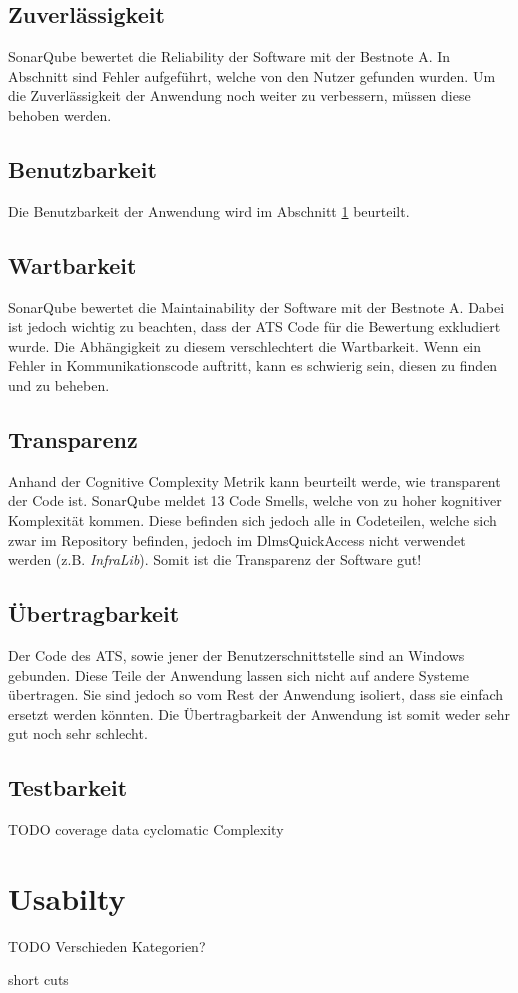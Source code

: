 \subsection{Zuverlässigkeit}
SonarQube bewertet die Reliability der Software mit der Bestnote \dq A\dq.
In Abschnitt \label{gefundeneFehler} sind Fehler aufgeführt, welche von den Nutzer gefunden wurden.
Um die Zuverlässigkeit der Anwendung noch weiter zu verbessern, müssen diese behoben werden.

\subsection{Benutzbarkeit}
Die Benutzbarkeit der Anwendung wird im Abschnitt \ref{evalUsabilty} beurteilt.

\subsection{Wartbarkeit}
SonarQube bewertet die Maintainability der Software mit der Bestnote \dq A\dq.
Dabei ist jedoch wichtig zu beachten, dass der \ac{ATS} Code für die Bewertung exkludiert wurde.
Die Abhängigkeit zu diesem verschlechtert die Wartbarkeit.
Wenn ein Fehler in Kommunikationscode auftritt, kann es schwierig sein, diesen zu finden und zu beheben.

\subsection{Transparenz}
Anhand der Cognitive Complexity Metrik kann beurteilt werde, wie transparent der Code ist.
SonarQube meldet 13 Code Smells, welche von zu hoher kognitiver Komplexität kommen.
Diese befinden sich jedoch alle in Codeteilen, welche sich zwar im Repository befinden, jedoch im DlmsQuickAccess nicht verwendet werden (z.B. \textit{InfraLib}).
Somit ist die Transparenz der Software gut!

\subsection{Übertragbarkeit}
Der Code des \ac{ATS}, sowie jener der Benutzerschnittstelle sind an Windows gebunden.
Diese Teile der Anwendung lassen sich nicht auf andere Systeme übertragen.
Sie sind jedoch so vom Rest der Anwendung isoliert, dass sie einfach ersetzt werden könnten.
Die Übertragbarkeit der Anwendung ist somit weder sehr gut noch sehr schlecht.

\subsection{Testbarkeit}
TODO
coverage data
cyclomatic Complexity


\section{Usabilty}\label{evalUsabilty}
TODO
Verschieden Kategorien?

short cuts